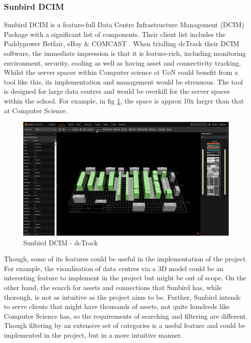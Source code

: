\documentclass [11pt,a4paper]{article}
\begin{document}
\subsubsection{Sunbird DCIM}
\label{sec:sunbird}
Sunbird DCIM is a feature-full Data Centre Infrastructure Management (DCIM) Package with a significant list of components. Their client list includes the Paddypower Betfair, eBay \& COMCAST \cite{Sunbird-we-know-data-centres}. When trialling dcTrack their DCIM software, the immediate impression is that it is feature-rich, including monitoring environment, security, cooling as well as having asset and connectivity tracking. Whilst the server spaces within Computer science at UoN could benefit from a tool like this, its implementation and management would be strenuous. The tool is designed for large data centres and would be overkill for the server spaces within the school. For example, in fig \ref{fig:sunbird_dcTrack}, the space is approx 10x larger than that at Computer Science. 

\begin{figure}[H]
    \centering
    \includegraphics[width=0.8\linewidth]{images/sunbirddcim.png}
    \caption{Sunbird DCIM - dcTrack}
    \label{fig:sunbird_dcTrack}
\end{figure}

Though, some of its features could be useful in the implementation of the project. For example, the visualisation of data centres via a 3D model could be an interesting feature to implement in the project but might be out of scope. On the other hand, the search for assets and connections that Sunbird has, while thorough, is not as intuitive as the project aims to be. Further, Sunbird intends to serve clients that might have thousands of assets, not quite hundreds like Computer Science has, so the requirements of searching and filtering are different. Though filtering by an extensive set of categories is a useful feature and could be implemented in the project, but in a more intuitive manner.
\end{document}
